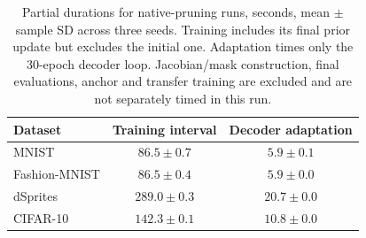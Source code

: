 \begin{table}[H]
\caption{Partial durations for native-pruning runs, seconds, mean $\pm$ sample SD across three seeds. Training includes its final prior update but excludes the initial one. Adaptation times only the 30-epoch decoder loop. Jacobian/mask construction, final evaluations, anchor and transfer training are excluded and are not separately timed in this run.}\label{tab:ardprunedcost}
\small
\setlength{\tabcolsep}{3pt}
\begin{tabular*}{\textwidth}{@{\extracolsep{\fill}}lcc@{}}
\toprule
Dataset & Training interval & Decoder adaptation \\
\midrule
MNIST & $86.5 \pm 0.7$ & $5.9 \pm 0.1$ \\
Fashion-MNIST & $86.5 \pm 0.4$ & $5.9 \pm 0.0$ \\
dSprites & $289.0 \pm 0.3$ & $20.7 \pm 0.0$ \\
CIFAR-10 & $142.3 \pm 0.1$ & $10.8 \pm 0.0$ \\
\bottomrule\end{tabular*}
\end{table}
